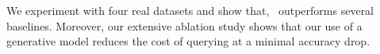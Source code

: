 \documentclass[letterpaper]{article}
\renewcommand{\cite}{\citep}
\begin{document}




We experiment with four real datasets and show that, \our\ outperforms several baselines. Moreover, our extensive ablation study shows that our use of a generative model reduces the cost of querying at a minimal accuracy drop. 
%

\end{document}
